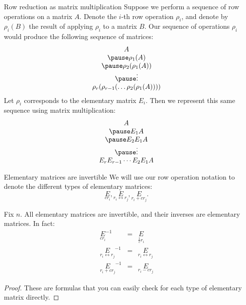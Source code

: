 \begin{frame}{Row reduction as matrix multiplication}
\footnotesize
Suppose we perform a sequence of row operations on a matrix $A$. Denote the $i$-th row operation $\rho_i$, and denote by $\rho_i(B)$ the result of applying $\rho_i$ to a matrix $B$. 
\bpause 
Our sequence of operations $\rho_i$ would produce the following sequence of matrices:
\[
\begin{array}{c}
A\\
\pause\rho_1(A)\\
\pause\rho_2(\rho_1(A))\\
\pause \vdots \\
\rho_r(\rho_{r-1}(\dots \rho_2(\rho_1(A))))
\end{array}
\]
\bpause Let $\rho_i$ corresponds to the elementary matrix $E_i$. Then we represent this same sequence using matrix multiplication:
\[
\begin{array}{c}
A\\
\pause E_1A\\
\pause E_2E_1A\\
\pause \vdots \\
E_rE_{r-1}\cdots E_2E_1A
\end{array}
\]
\end{frame}
\begin{frame}{Elementary matrices are invertible}
We will use our row operation notation to denote the different types of elementary matrices:
\[
\underset{cr_i}{E}, \underset{r_i\leftrightarrow r_j}{E}, \underset{r_i+cr_j}E.
\] 
\pause
\begin{theorem}
Fix $n$. All elementary matrices are invertible, and their inverses are elementary matrices. In fact:
\begin{eqnarray*}
\underset{cr_i}{E}^{-1}&=&\underset{\frac{1}{c}r_i}{E}\\
\underset{r_i\leftrightarrow r_j}{E}^{-1}&=&\underset{r_i\leftrightarrow r_j}{E}\\
\underset{r_i+cr_j}E^{-1}&=&\underset{r_i-cr_j}E
\end{eqnarray*}
\end{theorem}
\pause
\begin{proof}
These are formulas that you can easily check for each type of elementary matrix directly. 
\end{proof}
\end{frame}
